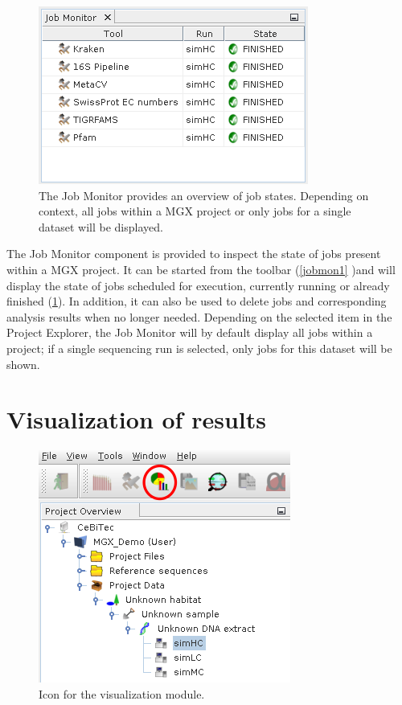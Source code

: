 \begin{figure}[H]
\centering
\includegraphics[width=.6\textwidth]{img/mgx/JobMon}
\caption[Job monitor]{The Job Monitor provides an overview of job states. Depending on context, all jobs
within a MGX project or only jobs for a single dataset will be displayed.}
\label{jobmon2}
\end{figure}

The Job Monitor component is provided to inspect the state of jobs present within a MGX project.
It can be started from the toolbar (\ref{jobmon1} )and will display the state of jobs scheduled for execution,
currently running or already finished (\ref{jobmon2}). In addition, it can also be used to delete jobs and
corresponding analysis results when no longer needed. Depending on the selected item in the
Project Explorer, the Job Monitor will by default display all jobs within a project; if a single
sequencing run is selected, only jobs for this dataset will be shown.

\section{Visualization of results}

\begin{figure}[H]
\centering
\includegraphics[width=.6\textwidth]{img/mgx/VizOpen}
\caption[Visualization]{Icon for the visualization module.}
\label{viz1}
\end{figure}

